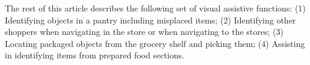 
The rest of this article describes the following set of visual
assistive functions: (1) Identifying objects in a pantry including
misplaced items; (2) Identifying other shoppers when navigating in the
store or when navigating to the stores; (3) Locating packaged objects
from the grocery shelf and picking them; (4) Assisting in identifying
items from prepared food sections. 

